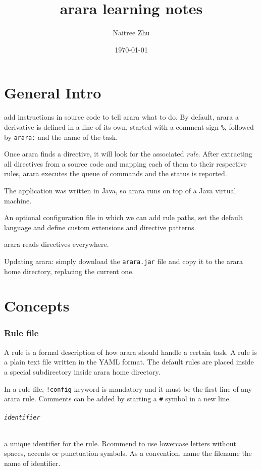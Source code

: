 \documentclass[a4paper]{article}
\title{arara learning notes}
\author{Naitree Zhu}
\date{\today}
\begin{document}
\maketitle

\part{General Intro}
add instructions in source code to tell arara what to do. By default, arara a derivative is defined in a line of its own, started with a comment sign \verb|%|, followed by \verb|arara:| and the name of the task.

Once arara finds a directive, it will look for the associated \emph{rule}. After extracting all directives from a source code and mapping each of them to their respective rules, arara executes the queue of commands and the status is reported.

The application was written in Java, so arara runs on top of a Java virtual machine.

An optional configuration file in which we can add rule paths, set the default language and define custom extensions and directive patterns.

arara reads directives everywhere.

Updating arara: simply download the \verb|arara.jar| file and copy it to the arara home directory, replacing the current one.
\part{Concepts}
\section{Rule file}
A rule is a formal description of how arara should handle a certain task. A rule is a plain text file written in the YAML format.
The default rules are placed inside a special subdirectory inside arara home directory.

In a rule file, \verb|!config| keyword is mandatory and it must be the first line of any arara rule. Comments can be added by starting a \verb|#| symbol in a new line. 
\paragraph{\texttt{identifier}}
a unique identifier for the rule. Rcommend to use lowercase letters without spaces, accents or punctuation symbols. As a convention, name the filename the name of identifier.
\end{document}
